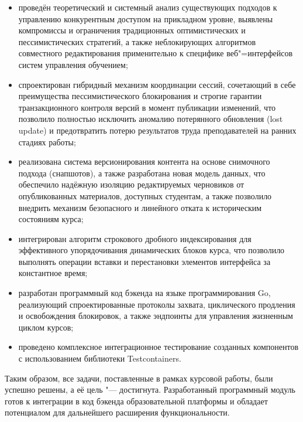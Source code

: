 \documentclass[coursework]{SCWorks}
\begin{document}
\begin{itemize}
  \item проведён теоретический и системный анализ существующих подходов к управлению конкурентным доступом на прикладном уровне, выявлены компромиссы и ограничения традиционных оптимистических и пессимистических стратегий, а также неблокирующих алгоритмов совместного редактирования применительно к специфике веб"=интерфейсов систем управления обучением;
  \item спроектирован гибридный механизм координации сессий, сочетающий в себе преимущества пессимистического блокирования и строгие гарантии транзакционного контроля версий в момент публикации изменений, что позволило полностью исключить аномалию потерянного обновления (lost update) и предотвратить потерю результатов труда преподавателей на ранних стадиях работы;
  \item реализована система версионирования контента на основе снимочного подхода (снапшотов), а также разработана новая модель данных, что обеспечило надёжную изоляцию редактируемых черновиков от опубликованных материалов, доступных студентам, а также позволило внедрить механизм безопасного и линейного отката к историческим состояниям курса;
  \item интегрирован алгоритм строкового дробного индексирования для эффективного упорядочивания динамических блоков курса, что позволило выполнять операции вставки и перестановки элементов интерфейса за константное время;
  \item разработан программный код бэкенда на языке программирования Go, реализующий спроектированные протоколы захвата, циклического продления и освобождения блокировок, а также эндпоинты для управления жизненным циклом курсов;
  \item проведено комплексное интеграционное тестирование созданных компонентов с использованием библиотеки Testcontainers.
\end{itemize}

Таким образом, все задачи, поставленные в рамках курсовой работы, были успешно решены, а её цель "--- достигнута. Разработанный программный модуль готов к интеграции в код бэкенда образовательной платформы и обладает потенциалом для дальнейшего расширения функциональности.





\appendix
\end{document}
